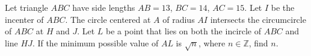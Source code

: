 Let triangle $ABC$ have side lengths $AB=13$, $BC=14$, $AC=15$. Let $I$ be the incenter of $ABC$. The circle centered at $A$ of radius $AI$ intersects the circumcircle of $ABC$ at $H$ and $J$. Let $L$ be a point that lies on both the incircle of $ABC$ and line $HJ$. If the minimum possible value of $AL$ is $\sqrt{n}$, where $n\in\mathbb{Z}$, find $n$.